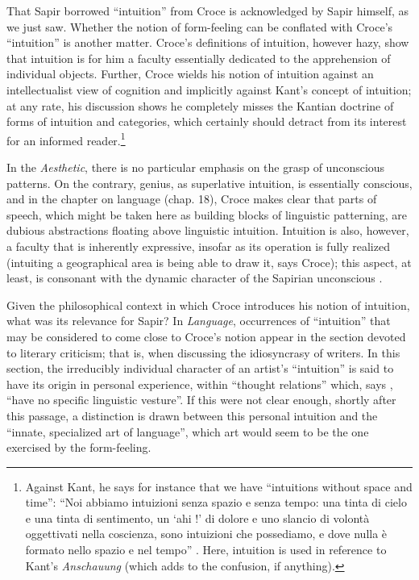 \documentclass[output=paper]{langscibook}
\begin{document}
That Sapir borrowed ``intuition'' from Croce is acknowledged by Sapir himself, as we just saw. Whether the notion of form-feeling can be conflated with Croce's ``intuition'' is another matter. Croce's definitions of intuition, however hazy, show that intuition is for him a faculty essentially dedicated to the apprehension of individual objects. Further, Croce wields his notion of intuition against an intellectualist view of cognition and implicitly against Kant's concept of intuition; at any rate, his discussion shows he completely misses the Kantian doctrine of forms of intuition and categories, which certainly should detract from its interest for an informed reader.\footnote{Against Kant, he says for instance that we have ``intuitions without space and time'': ``Noi abbiamo intuizioni senza spazio e senza tempo: una tinta di cielo e una tinta di sentimento, un `ahi !' di dolore e uno slancio di volontà oggettivati nella coscienza, sono intuizioni che possediamo, e dove nulla è formato nello spazio e nel tempo'' \citep[6--7]{Croce1908}. Here, intuition is used in reference to Kant's \emph{Anschauung} (which adds to the confusion, if anything).}

In the \emph{Aesthetic}, there is no particular emphasis on the grasp of unconscious patterns. On the contrary, genius, as superlative intuition, is essentially conscious, and in the chapter on language (chap. 18), Croce makes clear that parts of speech, which might be taken here as building blocks of linguistic patterning, are dubious abstractions floating above linguistic intuition. Intuition is also, however, a faculty that is inherently expressive, insofar as its operation is fully realized (intuiting a geographical area is being able to draw it, says Croce); this aspect, at least, is consonant with the dynamic character of the Sapirian unconscious \citep[see][]{Allen1986}.

Given the philosophical context in which Croce introduces his notion of intuition, what was its relevance for Sapir? In \emph{Language}, occurrences of ``intuition'' that may be considered to come close to Croce's notion appear in the section devoted to  literary criticism; that is, when discussing the idiosyncrasy of writers. In this section, the irreducibly individual character of an artist's ``intuition'' is said to have its origin in personal experience, within ``thought relations'' which, says \citet[239]{Sapir1921}, ``have no specific linguistic vesture''. If this were not clear enough, shortly after this passage, a distinction is drawn between this personal intuition and the ``innate, specialized art of language'', which art would seem to be the one exercised by the form-feeling.
\end{document}

